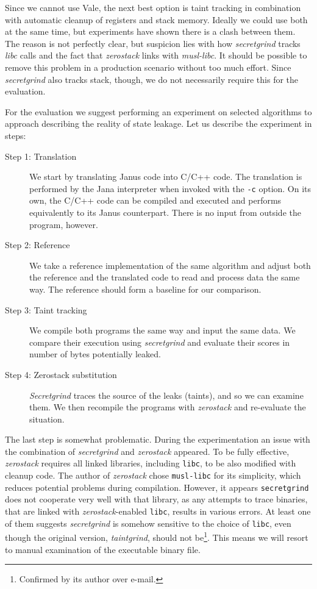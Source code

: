 \documentclass[a4paper,10pt,openright]{memoir}
\newcommand{\term}[1]{\textit{#1}}
\newcommand{\code}[1]{\texttt{#1}}
\begin{document}
Since we cannot use Vale, the next best option is taint tracking in 
combination with automatic cleanup of registers and stack memory. 
Ideally we could use both at the same time, but experiments have shown 
there is a clash between them. The reason is not perfectly clear, but 
suspicion lies with how \term{secretgrind} tracks \term{libc} calls and 
the fact that \term{zerostack} links with \term{musl-libc}. It should 
be possible to remove this problem in a production scenario without too 
much effort. Since \term{secretgrind} also tracks stack, though, we do 
not necessarily require this for the evaluation.

For the evaluation we suggest performing an experiment on selected 
algorithms to approach describing the reality of state leakage. Let us 
describe the experiment in steps:

\begin{description}

\item[Step 1: Translation] We start by translating Janus code into 
C/C++ code. The translation is performed by the Jana interpreter when 
invoked with the \code{-c} option. On its own, the C/C++ code can be 
compiled and executed and performs equivalently to its Janus 
counterpart. There is no input from outside the program, however.

\item[Step 2: Reference] We take a reference implementation of the same 
algorithm and adjust both the reference and the translated code to read 
and process data the same way. The reference should form a baseline for 
our comparison.

\item[Step 3: Taint tracking] We compile both programs the same way and 
input the same data. We compare their execution using 
\term{secretgrind} and evaluate their scores in number of bytes 
potentially leaked.

\item[Step 4: Zerostack substitution] \term{Secretgrind} traces the 
source of the leaks (taints), and so we can examine them. We then 
recompile the programs with \term{zerostack} and re-evaluate the 
situation.

\end{description}

The last step is somewhat problematic. During the experimentation an 
issue with the combination of \term{secretgrind} and \term{zerostack} 
appeared. To be fully effective, \term{zerostack} requires all linked 
libraries, including \code{libc}, to be also modified with cleanup 
code. The author of \term{zerostack} chose \code{musl-libc} for its 
simplicity, which reduces potential problems during compilation. 
However, it appears \code{secretgrind} does not cooperate very well 
with that library, as any attempts to trace binaries, that are linked 
with \term{zerostack}-enabled \code{libc}, results in various errors. 
At least one of them suggests \term{secretgrind} is somehow sensitive 
to the choice of \code{libc}, even though the original version, 
\term{taintgrind}, should not be\footnote{Confirmed by its author over 
e-mail.}. This means we will resort to manual examination of the 
executable binary file.
\end{document}
